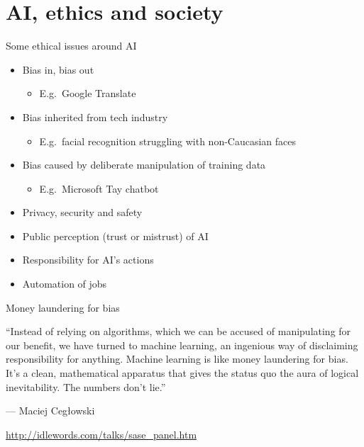 \part{AI, ethics and society}
\frame{\partpage}

\begin{frame}{Some ethical issues around AI}
	\begin{itemize}
		\pause\item Bias in, bias out
			\begin{itemize}
				\pause\item E.g.\ Google Translate
			\end{itemize}
		\pause\item Bias inherited from tech industry
			\begin{itemize}
				\pause\item E.g.\ facial recognition struggling with non-Caucasian faces
			\end{itemize}
		\pause\item Bias caused by deliberate manipulation of training data
			\begin{itemize}
				\pause\item E.g.\ Microsoft Tay chatbot
			\end{itemize}
		\pause\item Privacy, security and safety
		\pause\item Public perception (trust or mistrust) of AI
		\pause\item Responsibility for AI's actions
		\pause\item Automation of jobs
	\end{itemize}
\end{frame}

\begin{frame}{Money laundering for bias}

``Instead of relying on algorithms, which we can be accused of manipulating for
our benefit, we have turned to machine learning, an ingenious way of disclaiming
responsibility for anything. Machine learning is like money laundering for bias.
It's a clean, mathematical apparatus that gives the status quo the aura of
logical inevitability. The numbers don't lie.''

--- Maciej Ceg\l{}owski

{\tiny\url{http://idlewords.com/talks/sase_panel.htm}}
\end{frame}

